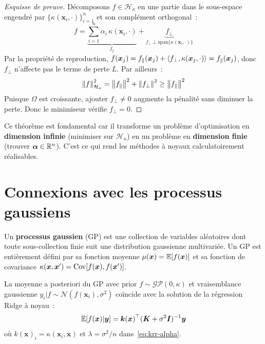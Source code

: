\begin{proof}[Esquisse de preuve]
D\'ecomposons $f \in \mathcal{H}_\kappa$ en une partie dans le
sous-espace engendr\'e par $\{\kappa(\bm{x}_i, \cdot)\}_{i=1}^n$
et son compl\'ement orthogonal~:
\begin{equation}
  f = \underbrace{\sum_{i=1}^n \alpha_i\, \kappa(\bm{x}_i, \cdot)}_{f_{\parallel}}
  + \underbrace{f_\perp}_{f_\perp \perp \text{span}\{\kappa(\bm{x}_i,\cdot)\}}
\end{equation}
Par la propri\'et\'e de reproduction,
$f(\bm{x}_j) = f_{\parallel}(\bm{x}_j) + \langle f_\perp, \kappa(\bm{x}_j, \cdot) \rangle = f_{\parallel}(\bm{x}_j)$,
donc $f_\perp$ n'affecte pas le terme de perte $L$. Par ailleurs~:
\begin{equation}
  \left\| f \right\|^2_{\mathcal{H}_\kappa} = \left\| f_{\parallel} \right\|^2 +
  \left\| f_\perp \right\|^2 \geq \left\| f_{\parallel} \right\|^2
\end{equation}
Puisque $\Omega$ est croissante, ajouter $f_\perp \neq 0$ augmente la
p\'enalit\'e sans diminuer la perte. Donc le minimiseur v\'erifie
$f_\perp = 0$.
\end{proof}

\begin{intuition}[title=\textbf{Port\'ee du th\'eor\`eme du repr\'esentant}]
Ce th\'eor\`eme est fondamental car il transforme un probl\`eme
d'optimisation en \textbf{dimension infinie} (minimiser sur
$\mathcal{H}_\kappa$) en un probl\`eme en \textbf{dimension finie}
(trouver $\bm{\alpha} \in \mathbb{R}^n$). C'est ce qui rend les m\'ethodes
\`a noyaux calculatoirement r\'ealisables.
\end{intuition}

\section{Connexions avec les processus gaussiens}
\label{sec:gp-connection}

\begin{definition}
Un \textbf{processus gaussien} (GP) est une collection de variables
al\'eatoires dont toute sous-collection finie suit une distribution
gaussienne multivari\'ee. Un GP est enti\`erement d\'efini par sa
fonction moyenne $\mu(\bm{x}) = \mathbb{E}[f(\bm{x})]$ et sa fonction de
covariance $\kappa(\bm{x}, \bm{x}') = \mathrm{Cov}[f(\bm{x}), f(\bm{x}')]$.
\end{definition}

\begin{proposition}
\label{prop:gp-krr}
La moyenne a posteriori du GP avec prior $f \sim \mathcal{GP}(0, \kappa)$
et vraisemblance gaussienne $y_i | f \sim \mathcal{N}(f(\bm{x}_i),
\sigma^2)$ co\"incide avec la solution de la r\'egression Ridge \`a
noyau~:
\begin{equation}
  \mathbb{E}[f(\bm{x}) | \bm{y}] = \bm{k}(\bm{x})^\top
  (\bm{K} + \sigma^2 \bm{I})^{-1} \bm{y}
  \label{eq:gp-posterior-mean}
\end{equation}
o\`u $k(\bm{x})_i = \kappa(\bm{x}_i, \bm{x})$ et $\lambda = \sigma^2 / n$
dans~\eqref{eq:krr-alpha}.
\end{proposition}

